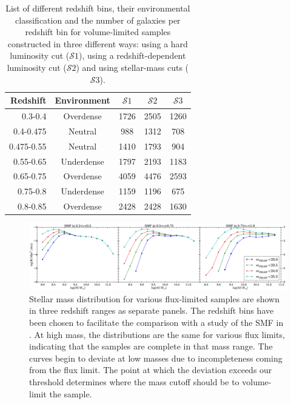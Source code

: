 \documentclass[twocolumn,useAMS,usenatbib]{mn2e}
\newcommand{\s}{\ensuremath{\mathcal{S}}}
\begin{document}
\begin{table} 
\centering
\begin{tabular}{|r|c|c|c|c|}
 \hline
 Redshift & Environment & \s$1$ & \s$2$ & \s$3$ \\
 \hline
 0.3-0.4 & Overdense & 1726 & 2505 & 1260 \\
 0.4-0.475 & Neutral & 988 & 1312 & 708 \\
 0.475-0.55 & Neutral & 1410 & 1793 & 904 \\
 0.55-0.65 & Underdense & 1797 & 2193 & 1183 \\
 0.65-0.75 & Overdense & 4059 & 4476 & 2593 \\
 0.75-0.8 & Underdense & 1159 & 1196 & 675 \\
 0.8-0.85 & Overdense & 2428 & 2428 & 1630 \\
 \hline
\end{tabular}
\caption{List of different redshift bins, their environmental
  classification and the number of galaxies per redshift bin for
  volume-limited samples constructed in three different ways: using a
  hard luminosity cut (\s$1$), using a redshift-dependent luminosity cut (\s$2$) and using stellar-mass cuts (\s$3$).}
\label{table:GalaxyCounts}
\end{table}

\begin{figure}
 \centering
 \includegraphics[width=2.2\columnwidth]{SMF}
 \caption{Stellar mass distribution for various flux-limited samples
   are shown in three redshift ranges as separate panels. The redshift
   bins have been chosen to facilitate the comparison with  
          a study of the SMF in \protect\cite{Tomczak_SMF}. At high mass, the
          distributions are the same for various flux limits,
          indicating that the samples are complete in that mass
          range. The curves begin to deviate at low masses due to
          incompleteness coming from the flux limit.  The point at
          which the deviation exceeds our threshold determines where the mass cutoff should be to volume-limit the sample.
          }
 \label{fig:smf}
\end{figure}
\end{document}
